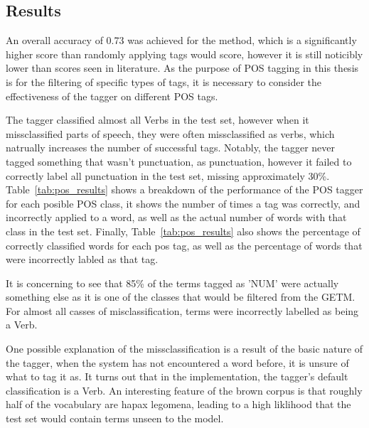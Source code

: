 \documentclass[10pt]{report}
\begin{document}
\subsection{Results}

An overall accuracy of 0.73 was achieved for the method, which is a significantly higher score than randomly applying tags would score, however it is still noticibly lower than scores seen in literature. As the purpose of POS tagging in this thesis is for the filtering of specific types of tags, it is necessary to consider the effectiveness of the tagger on different POS tags.

The tagger classified almost all Verbs in the test set, however when it missclassified parts of speech, they were often missclassified as verbs, which natrually increases the number of successful tags. Notably, the tagger never tagged something that wasn't punctuation, as punctuation, however it failed to correctly label all punctuation in the test set, missing approximately 30\%. Table~\ref{tab:pos_results} shows a breakdown of the performance of the POS tagger for each posible POS class, it shows the number of times a tag was correctly, and incorrectly applied to a word, as well as the actual number of words with that class in the test set. Finally, Table~\ref{tab:pos_results} also shows the percentage of correctly classified words for each pos tag, as well as the percentage of words that were incorrectly labled as that tag.

It is concerning to see that 85\% of the terms tagged as 'NUM' were actually something else as it is one of the classes that would be filtered from the GETM. For almost all casses of misclassification, terms were incorrectly labelled as being a Verb.

One possible explanation of the missclassification is a result of the basic nature of the tagger, when the system has not encountered a word before, it is unsure of what to tag it as. It turns out that in the implementation, the tagger's default classification is a Verb. An interesting feature of the brown corpus is that roughly half of the vocabulary are hapax legomena, leading to a high liklihood that the test set would contain terms unseen to the model. 
\end{document}

